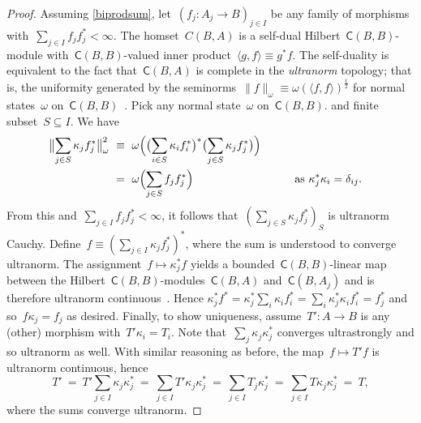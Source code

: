 \documentclass[reqno,T1]{amsproc}
\newcommand{\cat}[1]{\mathsf{#1}}		%
\theoremstyle{plain}
\theoremstyle{remark}
\numberwithin{equation}{section}
\begin{document}
\begin{proof}
Assuming \ref{biprodsum},
let~$\left(f_j: A_j \to B\right)_{j\in I}$ be any family of morphisms
        with~$\sum_{j \in I}f_jf_j^* < \infty$.
The homset~$C(B,A)$
    is a self-dual Hilbert~$\cat{C}(B,B)$-module
    with~$\cat{C}(B,B)$-valued inner
    product~$\langle g, f\rangle \equiv g^*f$.\cite[2.15]{wstarcat}
The self-duality is equivalent to the fact
    that~$\cat{C}(B,A)$ is complete in the \emph{ultranorm} topology;
    that is, the uniformity
    generated by the seminorms~$\| f \|_\omega \equiv \omega(\langle f,f\rangle)^\frac{1}{2}$
    for normal states~$\omega$ on~$\cat{C}(B,B)$~\cite[\S149\textsubscript{V}]{bas}.
    Pick any normal state~$\omega$ on~$\cat{C}(B,B)$.
        and finite subset~$S \subseteq I$.  We have
\begin{alignat*}{2}
    \bigl\| \sum_{j \in S} \kappa_j f_j^* \bigr\|^2_\omega
    &\ \equiv \ 
    \omega\Bigl(\bigl(\sum_{i \in S} \kappa_i f_i^*\bigr)^*
            \bigl(\sum_{j \in S} \kappa_j f_j^*\bigr)\Bigr) \\
    &\ =\ 
    \omega\Bigl( \sum_{j \in S} f_j f_j^*
    \Bigr) &\qquad&\text{as~$\kappa_j^*\kappa_i = \delta_{ij}$}.
\end{alignat*}
From this and~$\sum_{j \in I} f_jf_j^* < \infty$,
    it follows that~$(\sum_{j \in S} \kappa_j f_j^*)_S$
    is ultranorm Cauchy.
    Define~$f \equiv ( \sum_{j \in I} \kappa_jf_j^* )^*$,
        where the sum is understood to converge ultranorm.
The assignment~$f \mapsto \kappa_j^*f$
    yields a bounded~$\cat{C}(B,B)$-linear map between
    the Hilbert~$\cat{C}(B,B)$-modules~$\cat{C}(B,A)$ and~$\cat{C}(B,A_j)$
    and is therefore ultranorm continuous~\cite[\S148]{bas}.
    Hence
        $\kappa_j^* f^*
             =  \kappa_j^* \sum_{i} \kappa_i f_i^*
             =  \sum_i \kappa_{j }^*\kappa_i f_i^*
            =  f_j^*$
            and so~$f \kappa_j = f_j$ as desired.
Finally, to show uniqueness,
    assume~$T'\colon A \to B$ is any (other)
    morphism with~$T' \kappa_i = T_i$.
    Note that~$\sum_j \kappa_j \kappa_j^*$
       converges ultrastrongly
       and so ultranorm as well.
With similar reasoning as before,
        the map~$f \mapsto T' f$ is ultranorm continuous,
        hence
\begin{equation*}
    T'
    \ =\ T' \sum_{j \in I} \kappa_j \kappa_j^*
    \ =\ \sum_{j \in I} T' \kappa_j \kappa_j^*
    \ =\ \sum_{j \in I} T_j \kappa_j^*
    \ =\ \sum_{j \in I} T \kappa_j \kappa_j^*
    \ =\ T,
\end{equation*}
    where the sums converge ultranorm.
\end{proof}
\end{document}
